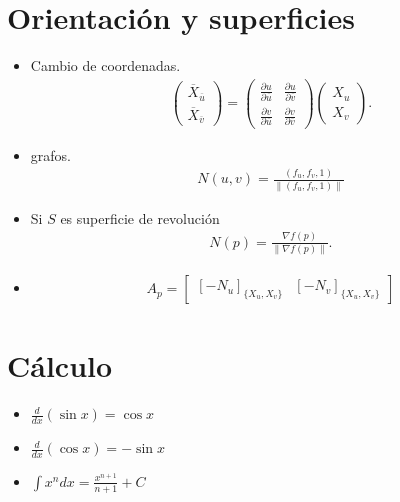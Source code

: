 \documentclass[10pt]{article}
\begin{document}
\scriptsize %

\begin{multicols}{3} %


\section*{Orientación y superficies}
\begin{itemize}
  \item Cambio de coordenadas. 
    \begin{align*}
      \begin{pmatrix}
        \overline{X}_{\overline{u}} \\
        \overline{X}_{\overline{v}}
      \end{pmatrix}
      =\begin{pmatrix}
        \frac{\partial u}{\partial \overline{u}} & \frac{\partial u}{\partial \overline{v}} \\
       \frac{\partial v}{\partial \overline{u}}& \frac{\partial v}{\partial \overline{v}}
      \end{pmatrix}\begin{pmatrix}
        X_{u} \\
        X_{v}
      \end{pmatrix}.
    \end{align*}
    \item grafos. 
      \begin{align*}
        N(u,v)=\frac{(f_{u},f_{v},1)}{\|(f_{u},f_{v},1)\|}
      \end{align*}
    \item Si $S$ es superficie de revolución
      \begin{align*}
        N(p)=\frac{\nabla f(p)}{\|\nabla f(p)\|}.
      \end{align*}
    \item 
      \begin{align*}
        A_{p}=\begin{bmatrix}
          \left[ -N_{u}\right]_{\{X_{u},X_{v}\}} & \left[ -N_{v}\right]_{\{X_{u},X_{v}\}}
        \end{bmatrix}
      \end{align*}
\end{itemize}

\section*{Cálculo}
\begin{itemize}
    \item $\displaystyle \frac{d}{dx}(\sin x) = \cos x$
    \item $\displaystyle \frac{d}{dx}(\cos x) = -\sin x$
    \item $\displaystyle \int x^n dx = \frac{x^{n+1}}{n+1} + C$
\end{itemize}


\end{multicols}
\end{document}
